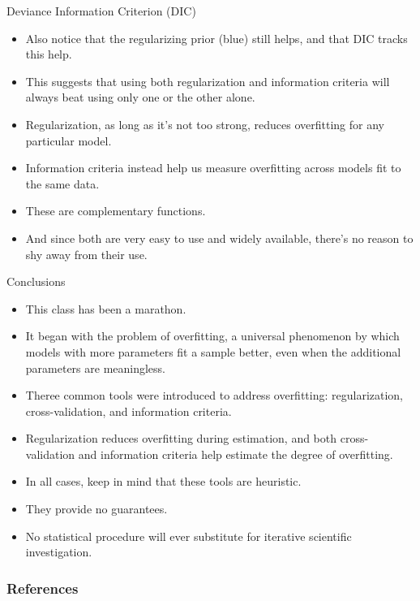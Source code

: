 \documentclass[handout]{beamer}
\begin{document}
\begin{frame}{Deviance Information Criterion (DIC)}
\scriptsize{


\begin{itemize}
 


\item Also notice that the regularizing prior (blue) still helps, and that DIC tracks this help.
\item This suggests that using both regularization and information criteria will always beat using only one or the other alone. 
\item Regularization, as long as it's not too strong, reduces  overfitting for any particular model. \item Information criteria instead help us measure overfitting across models fit to the same data. 
\item These are complementary functions. 
\item And since both are very easy to use and widely available, there's no reason to shy away from their use.


\end{itemize}


} 
\end{frame}


\begin{frame}{Conclusions}
\scriptsize{

\begin{itemize}
\item This class has been a marathon. 
\item It began with the problem of overfitting, a universal phenomenon by which models with more parameters fit a sample better, even when the additional parameters are meaningless.
\item Theree common tools were introduced to address overfitting: regularization, cross-validation, and information criteria.
\item Regularization reduces overfitting during estimation, and both cross-validation and information criteria help estimate the degree of overfitting. 
\item In all cases, keep in mind that these tools are heuristic. 
\item They provide no guarantees. 
\item No statistical procedure will ever substitute for iterative scientific investigation.
\end{itemize}


} 
\end{frame}


\begin{frame}[allowframebreaks]\scriptsize
\frametitle{References}


%
\end{frame}  









\end{document}
